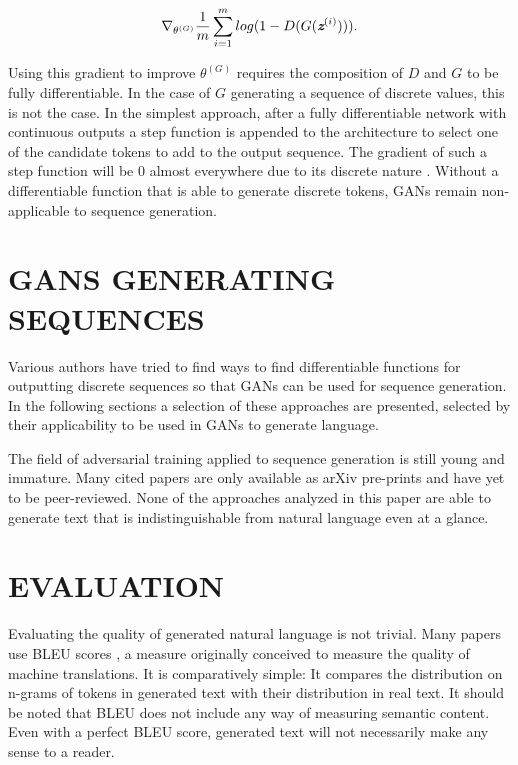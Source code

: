 \documentclass[a4paper,conference]{IEEEtran}
\def\mathbi#1{\textbf{\em #1}}
\begin{document}
\begin{dmath}
\nabla_{\theta^{(G)}} \frac{1}{m} \sum_{i=1}^{m} log (1-D(G(\mathbi{z}^{(i)}))).
\end{dmath}

Using this gradient to improve $\theta^{(G)}$ requires the composition of $D$ and $G$ to be fully differentiable. In the case of $G$ generating a sequence of discrete values, this is not the case. In the simplest approach, after a fully differentiable network with continuous outputs a step function is appended to the architecture to select one of the candidate tokens to add to the output sequence. The gradient of such a step function will be 0 almost everywhere due to its discrete nature \cite{c4}. Without a differentiable function that is able to generate discrete tokens, GANs remain non-applicable to sequence generation.

\section{GANS GENERATING SEQUENCES}

Various authors have tried to find ways to find differentiable functions for outputting discrete sequences so that GANs can be used for sequence generation. In the following sections a selection of these approaches are presented, selected by their applicability to be used in GANs to generate language. 

The field of adversarial training applied to sequence generation is still young and immature. Many cited papers are only available as arXiv pre-prints and have yet to be peer-reviewed. None of the approaches analyzed in this paper are able to generate text that is indistinguishable from natural language even at a glance. 

\section{EVALUATION}

Evaluating the quality of generated natural language is not trivial. Many papers use BLEU scores \cite{c11}, a measure originally conceived to measure the quality of machine translations. It is comparatively simple: It compares the distribution on n-grams of tokens in generated text with their distribution in real text. It should be noted that BLEU does not include any way of measuring semantic content. Even with a perfect BLEU score, generated text will not necessarily make any sense to a reader.
\end{document}
